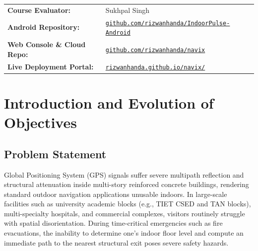 \documentclass[11pt,a4paper]{article}
\begin{document}
\begin{titlepage}
    \vfill
    \renewcommand{\arraystretch}{1.35}
    \begin{tabularx}{\textwidth}{@{}L{5.6cm} Y@{}}
        \textbf{Course Evaluator:} &  Sukhpal Singh \\
        \textbf{Android Repository:} & \href{https://github.com/rizwanhanda/IndoorPulse-Android}{\texttt{github.com/rizwanhanda/IndoorPulse-Android}} \\
        \textbf{Web Console \& Cloud Repo:} & \href{https://github.com/rizwanhanda/navix}{\texttt{github.com/rizwanhanda/navix}} \\
        \textbf{Live Deployment Portal:} & \href{https://rizwanhanda.github.io/navix/}{\texttt{rizwanhanda.github.io/navix/}}
    \end{tabularx}
\end{titlepage}

\tableofcontents
\newpage

\section{Introduction and Evolution of Objectives}

\subsection{Problem Statement}
Global Positioning System (GPS) signals suffer severe multipath reflection and structural attenuation inside multi-story reinforced concrete buildings, rendering standard outdoor navigation applications unusable indoors. In large-scale facilities such as university academic blocks (e.g., TIET CSED and TAN blocks), multi-specialty hospitals, and commercial complexes, visitors routinely struggle with spatial disorientation. During time-critical emergencies such as fire evacuations, the inability to determine one's indoor floor level and compute an immediate path to the nearest structural exit poses severe safety hazards.
\end{document}
